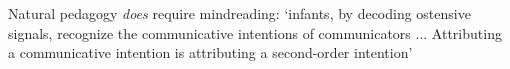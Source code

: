 \documentclass[11pt]{extarticle}
\begin{document}
\begin{multicols}{3}
Natural pedagogy \emph{does} require mindreading:
`infants, by decoding ostensive signals, recognize the communicative intentions of communicators ... Attributing a communicative intention is attributing a second-order intention'\citep{csibra:2010_recognizing} %






\footnotesize 


\end{multicols}
\end{document}
